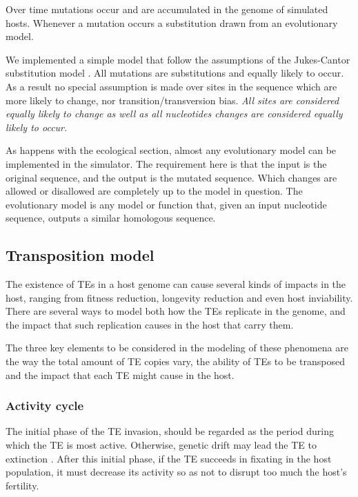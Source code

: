 \documentclass[10pt]{article}
\begin{document}
Over time mutations occur and are accumulated in the genome of
simulated hosts. Whenever a mutation occurs a substitution drawn from
an evolutionary model.

We implemented a simple model that follow the assumptions of the
Jukes-Cantor substitution model \cite{JC69}. All mutations are
substitutions and equally likely to occur. As a result no special
assumption is made over sites in the sequence which are more likely to
change, nor transition/transversion bias. \emph{ All sites are
  considered equally likely to change as well as all nucleotides
  changes are considered equally likely to occur.}

As happens with the ecological section, almost any evolutionary model
can be implemented in the simulator. The requirement here is that the
input is the original sequence, and the output is the mutated
sequence. Which changes are allowed or disallowed are completely up to
the model in question. The evolutionary model is any model or function
that, given an input nucleotide sequence, outputs a similar homologous
sequence.

\subsection{Transposition model}

The existence of TEs in a host genome can cause several kinds of
impacts in the host, ranging from fitness reduction, longevity
reduction and even host inviability. There are several ways to model
both how the TEs replicate in the genome, and the impact that such
replication causes in the host that carry them.

The three key elements to be considered in the modeling of these
phenomena are the way the total amount of TE copies vary, the ability
of TEs to be transposed and the impact that each TE might cause in the
host.

\subsubsection{Activity cycle}
The initial phase of the TE invasion, should be regarded as the period
during which the TE is most active. Otherwise, genetic drift may lead
the TE to extinction \cite{rouzic2005b}. After this initial phase, if
the TE succeeds in fixating in the host population, it must decrease
its activity so as not to disrupt too much the host's fertility.

\end{document}
